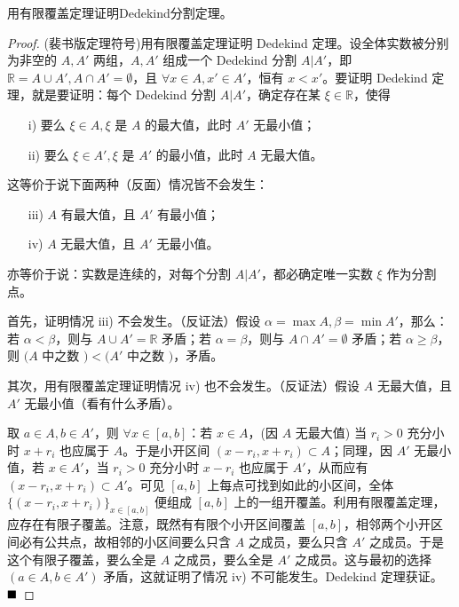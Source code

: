     \begin{problem}
        用有限覆盖定理证明Dedekind分割定理。
    \end{problem}

    \begin{proof}
         (裴书版定理符号)用有限覆盖定理证明 Dedekind 定理。设全体实数被分别为非空的 $A, A'$ 两组，$A, A'$ 组成一个 Dedekind 分割 $A | A'$，即 $\mathbb{R} = A \cup A', A \cap A' = \emptyset$，且 $\forall x \in A, x' \in A'$，恒有 $x < x'$。要证明 Dedekind 定理，就是要证明：每个 Dedekind 分割 $A | A'$，确定存在某 $\xi \in \mathbb{R}$，使得
        \begin{itemize}
            \item[i)] 要么 $\xi \in A, \xi$ 是 $A$ 的最大值，此时 $A'$ 无最小值；
            \item[ii)] 要么 $\xi \in A', \xi$ 是 $A'$ 的最小值，此时 $A$ 无最大值。
        \end{itemize}
        这等价于说下面两种（反面）情况皆不会发生：
        \begin{itemize}
            \item[iii)] $A$ 有最大值，且 $A'$ 有最小值；
            \item[iv)] $A$ 无最大值，且 $A'$ 无最小值。
        \end{itemize}
        亦等价于说：实数是连续的，对每个分割 $A | A'$，都必确定唯一实数 $\xi$ 作为分割点。
        
        首先，证明情况 iii) 不会发生。（反证法）假设 $\alpha = \max A, \beta = \min A'$，那么：若 $\alpha < \beta$，则与 $A \cup A' = \mathbb{R}$ 矛盾；若 $\alpha = \beta$，则与 $A \cap A' = \emptyset$ 矛盾；若 $\alpha \geq \beta$，则 $(A$ 中之数 $) < (A'$ 中之数 $)$，矛盾。
        
        其次，用有限覆盖定理证明情况 iv) 也不会发生。（反证法）假设 $A$ 无最大值，且 $A'$ 无最小值（看有什么矛盾）。
        
        取 $a \in A, b \in A'$，则 $\forall x \in [a, b]$：若 $x \in A$，(因 $A$ 无最大值) 当 $r_i > 0$ 充分小时 $x + r_i$ 也应属于 $A$。于是小开区间 $(x - r_i, x + r_i) \subset A$；同理，因 $A'$ 无最小值，若 $x \in A'$，当 $r_i > 0$ 充分小时 $x - r_i$ 也应属于 $A'$，从而应有 $(x - r_i, x + r_i) \subset A'$。可见 $[a, b]$ 上每点可找到如此的小区间，全体 $\{(x - r_i, x + r_i)\}_{x \in [a, b]}$ 便组成 $[a, b]$ 上的一组开覆盖。利用有限覆盖定理，应存在有限子覆盖。注意，既然有有限个小开区间覆盖 $[a, b]$，相邻两个小开区间必有公共点，故相邻的小区间要么只含 $A$ 之成员，要么只含 $A'$ 之成员。于是这个有限子覆盖，要么全是 $A$ 之成员，要么全是 $A'$ 之成员。这与最初的选择 $(a \in A, b \in A')$ 矛盾，这就证明了情况 iv) 不可能发生。Dedekind 定理获证。
        $\hfill \blacksquare$
    \end{proof}
        
        